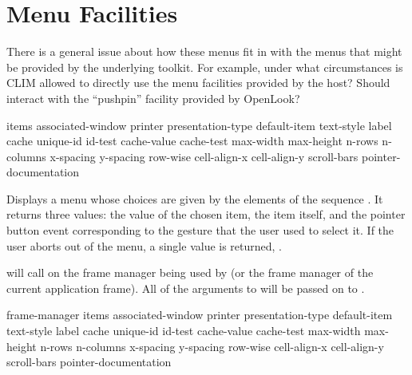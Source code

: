 
\chapter {Menu Facilities}
\label {menus}

 {There is a general issue about how these menus fit in with the
menus that might be provided by the underlying toolkit.  For example, under what
circumstances is CLIM allowed to directly use the menu facilities provided by
the host?  Should  interact with the ``pushpin''
facility provided by OpenLook?}


 {items \key associated-window printer presentation-type
                                      default-item text-style label
                                      cache unique-id id-test cache-value cache-test
                                      max-width max-height n-rows n-columns
                                      x-spacing y-spacing row-wise
                                      cell-align-x cell-align-y
                                      scroll-bars pointer-documentation}

Displays a menu whose choices are given by the elements of the sequence
.  It returns three values:  the value of the chosen item, the item
itself, and the pointer button event corresponding to the gesture that the user
used to select it.  If the user aborts out of the menu, a single value is
returned, .

 will call  on the frame manager
being used by  (or the frame manager of the current
application frame).  All of the arguments to  will be passed on
to .

 {frame-manager items
                                         \key associated-window printer presentation-type
                                              default-item text-style label
                                              cache unique-id id-test cache-value cache-test
                                              max-width max-height n-rows n-columns
                                              x-spacing y-spacing row-wise
                                              cell-align-x cell-align-y
                                              scroll-bars pointer-documentation}

